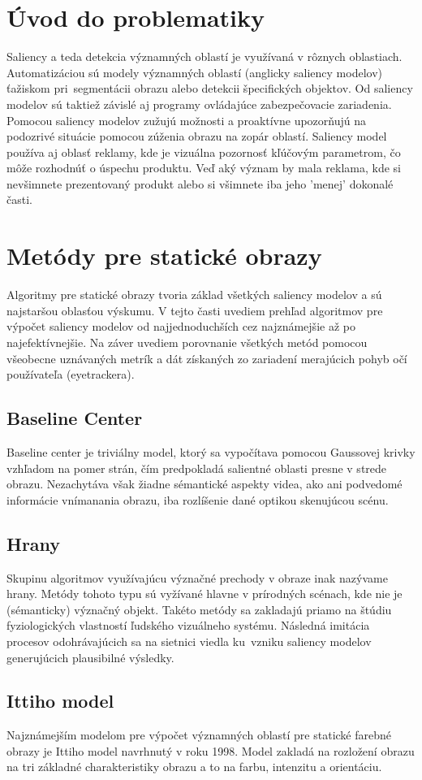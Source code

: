 \section{Úvod do problematiky}
Saliency a teda detekcia významných oblastí je využívaná v rôznych oblastiach.
Automatizáciou sú modely významných oblastí (anglicky saliency modelov) ťažiskom pri~segmentácii obrazu alebo detekcii špecifických objektov.
Od saliency modelov sú taktiež závislé aj programy ovládajúce zabezpečovacie zariadenia.
Pomocou saliency modelov zužujú možnosti a proaktívne upozorňujú na podozrivé situácie pomocou zúženia obrazu na zopár oblastí.
Saliency model používa aj oblasť reklamy, kde je vizuálna pozornosť kľúčovým parametrom, čo môže rozhodnúť o úspechu produktu.
Veď aký význam by mala reklama, kde si nevšimnete prezentovaný produkt alebo si všimnete iba jeho 'menej' dokonalé časti.
\section{Metódy pre statické obrazy}
Algoritmy pre statické obrazy tvoria základ všetkých saliency modelov a sú najstaršou oblasťou výskumu.
V tejto časti uvediem prehľad algoritmov pre výpočet saliency modelov od najjednoduchších cez najznámejšie až po najefektívnejšie.
Na záver uvediem porovnanie všetkých metód pomocou všeobecne uznávaných metrík a dát získaných zo zariadení merajúcich pohyb očí používateľa (eyetrackera).
\subsection{Baseline Center}\label{section:caseline-center}
Baseline center je triviálny model, ktorý sa vypočítava pomocou Gaussovej krivky vzhľadom na pomer strán, čím predpokladá salientné oblasti presne v strede obrazu.
Nezachytáva však žiadne sémantické aspekty videa, ako ani podvedomé informácie vnímanania obrazu, iba rozlíšenie dané optikou skenujúcou scénu.
\subsection{Hrany}
Skupinu algoritmov využívajúcu význačné prechody v obraze inak nazývame hrany.
Metódy tohoto typu sú vyžívané hlavne v prírodných scénach, kde nie je (sémanticky) význačný objekt.
Takéto metódy sa zakladajú priamo na štúdiu fyziologických vlastností ľudského vizuálneho systému.
Následná imitácia procesov odohrávajúcich sa na sietnici viedla ku~vzniku saliency modelov generujúcich plausibilné výsledky\cite{edges-1}.
\subsection{Ittiho model}
Najznámejším modelom pre výpočet významných oblastí pre statické farebné obrazy je Ittiho model navrhnutý v roku 1998.
Model zakladá na rozložení obrazu na tri základné charakteristiky obrazu a to na farbu, intenzitu a orientáciu.

